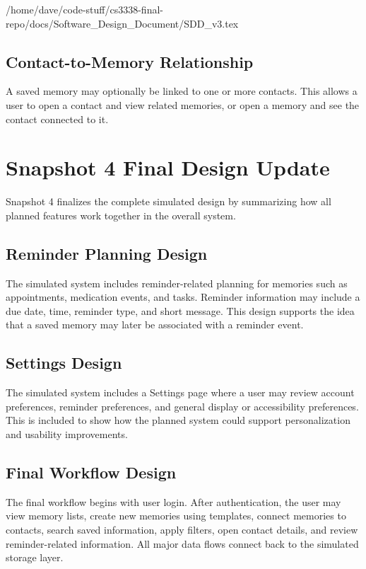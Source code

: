 /home/dave/code-stuff/cs3338-final-repo/docs/Software_Design_Document/SDD_v3.tex\documentclass{article}
\begin{document}
\subsection{Contact-to-Memory Relationship}

A saved memory may optionally be linked to one or more contacts. This allows a user to open a contact and view related memories, or open a memory and see the contact connected to it.

\section{Snapshot 4 Final Design Update}

Snapshot 4 finalizes the complete simulated design by summarizing how all planned features work together in the overall system.

\subsection{Reminder Planning Design}

The simulated system includes reminder-related planning for memories such as appointments, medication events, and tasks. Reminder information may include a due date, time, reminder type, and short message. This design supports the idea that a saved memory may later be associated with a reminder event.

\subsection{Settings Design}

The simulated system includes a Settings page where a user may review account preferences, reminder preferences, and general display or accessibility preferences. This is included to show how the planned system could support personalization and usability improvements.

\subsection{Final Workflow Design}

The final workflow begins with user login. After authentication, the user may view memory lists, create new memories using templates, connect memories to contacts, search saved information, apply filters, open contact details, and review reminder-related information. All major data flows connect back to the simulated storage layer.
\end{document}
